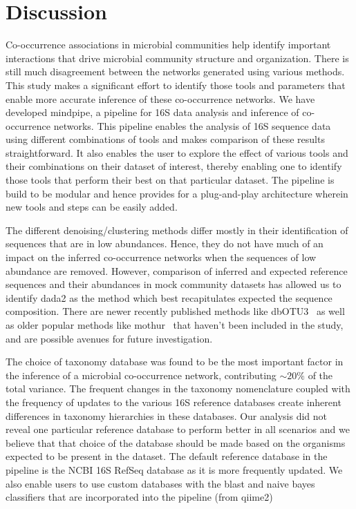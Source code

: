 
\section*{Discussion}


Co-occurrence associations in microbial communities help identify important interactions that drive microbial community structure and organization.
There is still much disagreement between the networks generated using various methods.
This study makes a significant effort to identify those tools and parameters that enable more accurate inference of these co-occurrence networks.
We have developed mindpipe, a pipeline for 16S data analysis and inference of co-occurrence networks.
This pipeline enables the analysis of 16S sequence data using different combinations of tools and makes comparison of these results straightforward.
It also enables the user to explore the effect of various tools and their combinations on their dataset of interest, thereby enabling one to identify those tools that perform their best on that particular dataset.
The pipeline is build to be modular and hence provides for a plug-and-play architecture wherein new tools and steps can be easily added.

The different denoising/clustering methods differ mostly in their identification of sequences that are in low abundances.
Hence, they do not have much of an impact on the inferred co-occurrence networks when the sequences of low abundance are removed.
However, comparison of inferred and expected reference sequences and their abundances in mock community datasets has allowed us to identify \ac{dada2} as the method which best recapitulates expected the sequence composition.
There are newer recently published methods like dbOTU3~\cite{Olesen2017} as well as older popular methods like mothur~\cite{Schloss2009} that haven't been included in the study, and are possible avenues for future investigation.

The choice of taxonomy database was found to be the most important factor in the inference of a microbial co-occurrence network, contributing $\sim20\%$ of the total variance.
The frequent changes in the taxonomy nomenclature coupled with the frequency of updates to the various 16S reference databases create inherent differences \cite{Balvociute2017} in taxonomy hierarchies in these databases.
Our analysis did not reveal one particular reference database to perform better in all scenarios and we believe that that choice of the database should be made based on the organisms expected to be present in the dataset.
The default reference database in the pipeline is the NCBI 16S RefSeq database as it is more frequently updated.
We also enable users to use custom databases \cite{Griffen2011,Ritari2015} with the blast and naive bayes classifiers that are incorporated into the pipeline (from \ac{qiime2})

